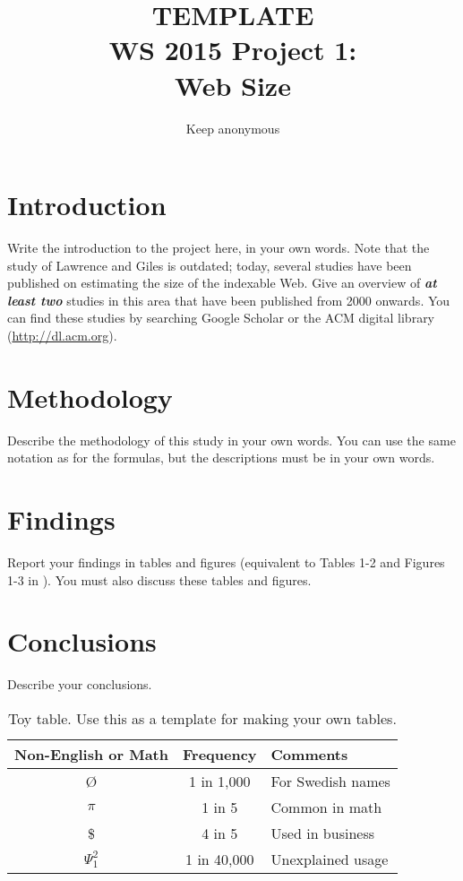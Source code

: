 \documentclass{sig-alternate}
\begin{document}
\title{TEMPLATE\\WS 2015 Project 1:\\Web Size}
\author{
\alignauthor 
Keep anonymous
}
\maketitle



\section{Introduction}
Write the introduction to the project here, in your own words. Note that the study of Lawrence and Giles is outdated; today, several studies have been published on estimating the size of the indexable Web. Give an overview of \textbf{\textit{at least two}} studies in this area that have been published from 2000 onwards. You can find these studies by searching Google Scholar or the ACM digital library (\url{http://dl.acm.org}). 

\section{Methodology}
Describe the methodology of this study in your own words. You can use the same notation as \cite{LawLee1998} for the formulas, but the descriptions must be in your own words.

\section{Findings}
Report your findings in tables and figures (equivalent to Tables 1-2 and Figures 1-3 in \cite{LawLee1998}). You must also discuss these tables and figures.


\section{Conclusions}
Describe your conclusions. 

\begin{table}
\centering
\caption{Toy table. Use this as a template for making your own tables.}
\begin{tabular}{|c|c|l|} \hline
Non-English or Math&Frequency&Comments\\ \hline
\O & 1 in 1,000& For Swedish names\\ \hline
$\pi$ & 1 in 5& Common in math\\ \hline
\$ & 4 in 5 & Used in business\\ \hline
$\Psi^2_1$ & 1 in 40,000& Unexplained usage\\
\hline\end{tabular}
\end{table}
\end{document}
